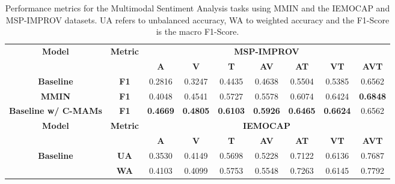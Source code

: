\begin{table}[htb!]
\centering
\footnotesize
\caption{Performance metrics for the Multimodal Sentiment Analysis tasks using MMIN and the IEMOCAP and MSP-IMPROV datasets. UA refers to unbalanced accuracy, WA to weighted accuracy and the F1-Score is the macro F1-Score.}
\label{tab:mmin_results}
\begin{tabular}{c|c|ccccccc}
\hline
\multirow{2}{*}{\textbf{Model}}              & \multirow{2}{*}{\textbf{Metric}} & \multicolumn{7}{c}{\textbf{MSP-IMPROV}}                                                                                     \\ \cline{3-9} 
                                             &                                  & \textbf{A}      & \textbf{V}      & \textbf{T}      & \textbf{AV}     & \textbf{AT}     & \textbf{VT}     & \textbf{AVT}    \\ \hline
\textbf{Baseline}                            & \textbf{F1}                      & 0.2816          & 0.3247          & 0.4435          & 0.4638          & 0.5504          & 0.5385          & 0.6562          \\ \hline
\textbf{MMIN}                                & \textbf{F1}                      & 0.4048          & 0.4541          & 0.5727          & 0.5578          & 0.6074          & 0.6424          & \textbf{0.6848} \\
\textbf{Baseline w/ C-MAMs}                  & \textbf{F1}                      & \textbf{0.4669} & \textbf{0.4805} & \textbf{0.6103} & \textbf{0.5926} & \textbf{0.6465} & \textbf{0.6624} & 0.6562          \\ \hline
\multirow{2}{*}{\textbf{Model}}              & \multirow{2}{*}{\textbf{Metric}} & \multicolumn{7}{c}{\textbf{IEMOCAP}}                                                                                        \\ \cline{3-9} 
                                             &                                  & \textbf{A}      & \textbf{V}      & \textbf{T}      & \textbf{AV}     & \textbf{AT}     & \textbf{VT}     & \textbf{AVT}    \\ \hline
\textbf{Baseline}                            & \textbf{UA}                      & 0.3530          & 0.4149          & 0.5698          & 0.5228          & 0.7122          & 0.6136          & 0.7687          \\
                                             & \textbf{WA}                      & 0.4103          & 0.4099          & 0.5753          & 0.5548          & 0.7263          & 0.6145          & 0.7792          \\ \hline

\end{tabular}
\end{table}
